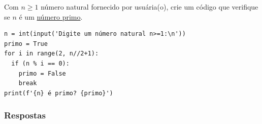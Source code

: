 \begin{exer}
  Com $n\geq 1$ número natural fornecido por usuária(o), crie um código que verifique se $n$ é um \href{https://pt.wikipedia.org/wiki/N\%C3\%BAmero_primo}{número primo}.
\end{exer}
\begin{resp}

\begin{lstlisting}
n = int(input('Digite um número natural n>=1:\n'))
primo = True
for i in range(2, n//2+1):
  if (n % i == 0):
    primo = False
    break
print(f'{n} é primo? {primo}')
\end{lstlisting}

\end{resp}

\ifisbook
\subsubsection{Respostas}
\shipoutAnswer
\fi

